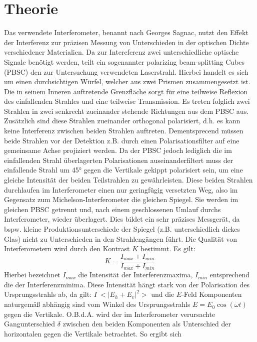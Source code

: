   \section{Theorie}
  Das verwendete Interferometer, benannt nach Georges Sagnac, nutzt den Effekt der Interferenz zur präzisen Messung von Unterschieden in der optischen Dichte verschiedener Materialien. Da zur Intereferenz zwei unterschiedliche optische Signale benötigt werden, teilt ein sogenannter polarizing beam-splitting Cubes (PBSC) den zur Untersuchung verwendeten Laserstrahl. Hierbei handelt es sich um einen durchsichtigen Würfel, welcher aus zwei Prismen zusammengesetzt ist. Die in seinem Inneren auftretende Grenzfläche sorgt für eine teilweise Reflexion des einfallenden Strahles und eine teilweise Transmission. Es treten folglich zwei Strahlen in zwei senkrecht zueinander stehende Richtungen aus dem PBSC aus. Zusätzlich sind diese Strahlen zueinander orthogonal polarisiert, d.h. es kann keine Interferenz zwischen beiden Strahlen auftreten. Dementsprecend müssen beide Strahlen vor der Detektion z.B. durch einen Polarisationsfilter auf eine gemeinsame Achse projiziert werden. Da der PBSC jedoch lediglich die im einfallenden Strahl überlagerten Polarisationen auseinanderfiltert muss der einfallende Strahl um 45° gegen die Vertikale gekippt polarisiert sein, um eine gleiche Intensität der beiden Teilstrahlen zu gewährleisten. Diese beiden Strahlen durchlaufen im Interferometer einen nur geringfügig versetzten Weg, also im Gegensatz zum Michelson-Interferometer die gleichen Spiegel. Sie werden im gleichen PBSC getrennt und, nach einem geschlossenen Umlauf durchs Interferometer, wieder überlagert. Dies bildet ein sehr präzises Messgerät, da bspw. kleine Produktionsunterschiede der Spiegel (z.B. unterschiedlich dickes Glas) nicht zu Unterschieden in den Strahlengängen führt. Die Qualität von Interferometern wird durch den Kontrast $K$ bestimmt. Es gilt:
  \begin{equation}
  	\label{eq:kontrast}
	K = \frac{I_{max}+I_{min}}{I_{max}+I_{min}}
  \end{equation}
Hierbei bezeichnet $I_{max}$ die Intensität der Interferenzmaxima, $I_{min}$ entsprechend die der Interferenzminima. Diese Intensität hängt stark von der Polarisation des Ursprungsstrahls ab, da gilt: $I~<|E_h+E_v|^2>$ und die $E$-Feld Komponenten naturgemäß abhängig sind vom Winkel des Ursprungsstrahls $E = E_0 \cos (\omega t)$ gegen die Vertikale. O.B.d.A. wird der im Interferometer verursachte Gangunterschied $\delta$ zwischen den beiden Komponenten als Unterschied der horizontalen gegen die Vertikale betrachtet. So ergibt sich
